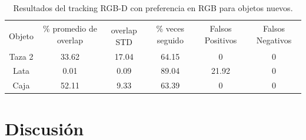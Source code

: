 \begin{table}[h]
    \begin{tabular}{|c|c|c|c|c|c|}
    \hline
    & \multirow{2}{2.4cm}{\% promedio de overlap} & & \multirow{2}{2cm}{\% veces seguido} & \multirow{2}{1.6cm}{Falsos Positivos} & \multirow{2}{1.6cm}{Falsos Negativos}\\
	Objeto & & overlap STD & & &\\
    \hline
    Taza 2  & 33.62      & 17.04       & 64.15             & 0                & 0\\
    \hline
    Lata    &  0.01      &  0.09       & 89.04             & 21.92            & 0\\
    \hline
    Caja    & 52.11      &  9.33       & 63.39             & 0                & 0\\
    \hline
    \end{tabular}
\caption{Resultados del tracking RGB-D con preferencia en RGB para objetos nuevos.}
\label{tabla_rgbd_rgb_nuevos}
\end{table}




\section{Discusión}